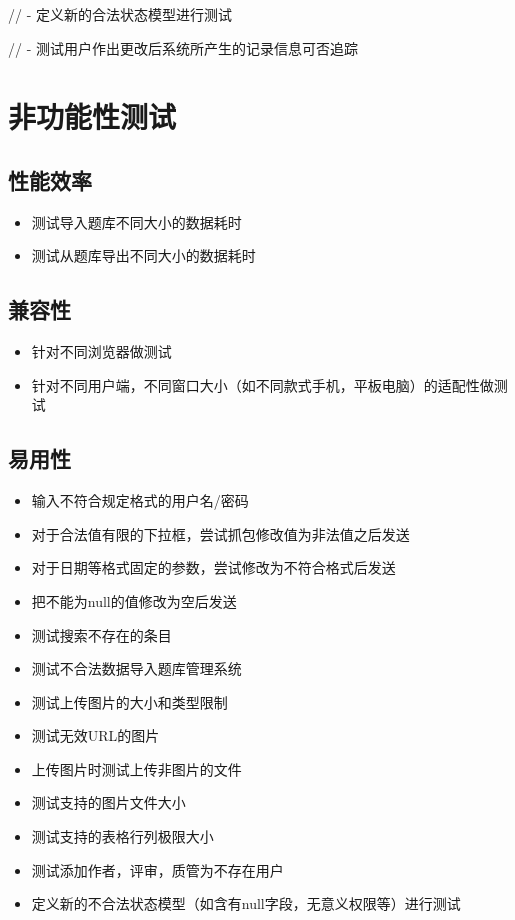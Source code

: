 \documentclass[hyperref, a4paper]{ctexart}
\providecommand{\tightlist}{%
  \setlength{\itemsep}{0pt}\setlength{\parskip}{0pt}}
\begin{document}
// - 定义新的合法状态模型进行测试

// - 测试用户作出更改后系统所产生的记录信息可否追踪

\hypertarget{ux975eux529fux80fdux6027ux6d4bux8bd5}{%
\section{非功能性测试}\label{ux975eux529fux80fdux6027ux6d4bux8bd5}}

\hypertarget{ux6027ux80fdux6548ux7387}{%
\subsection{性能效率}\label{ux6027ux80fdux6548ux7387}}

\begin{itemize}
\tightlist
\item
  测试导入题库不同大小的数据耗时
\item
  测试从题库导出不同大小的数据耗时
\end{itemize}

\hypertarget{ux517cux5bb9ux6027}{%
\subsection{兼容性}\label{ux517cux5bb9ux6027}}

\begin{itemize}
\tightlist
\item
  针对不同浏览器做测试
\item
  针对不同用户端，不同窗口大小（如不同款式手机，平板电脑）的适配性做测试
\end{itemize}

\hypertarget{ux6613ux7528ux6027}{%
\subsection{易用性}\label{ux6613ux7528ux6027}}

\begin{itemize}
\tightlist
\item
  输入不符合规定格式的用户名/密码
\item
  对于合法值有限的下拉框，尝试抓包修改值为非法值之后发送
\item
  对于日期等格式固定的参数，尝试修改为不符合格式后发送
\item
  把不能为null的值修改为空后发送
\item
  测试搜索不存在的条目
\item
  测试不合法数据导入题库管理系统
\item
  测试上传图片的大小和类型限制
\item
  测试无效URL的图片
\item
  上传图片时测试上传非图片的文件
\item
  测试支持的图片文件大小
\item
  测试支持的表格行列极限大小
\item
  测试添加作者，评审，质管为不存在用户
\item
  定义新的不合法状态模型（如含有null字段，无意义权限等）进行测试
\end{itemize}
\end{document}
